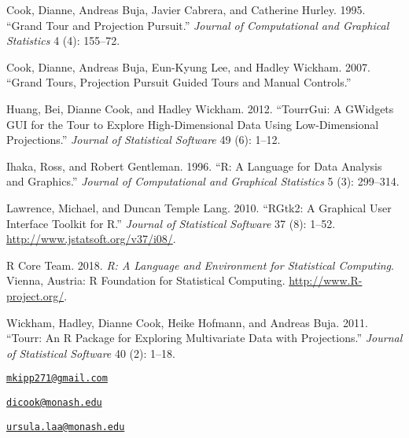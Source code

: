 Cook, Dianne, Andreas Buja, Javier Cabrera, and Catherine Hurley. 1995.
``Grand Tour and Projection Pursuit.'' \emph{Journal of Computational
and Graphical Statistics} 4 (4): 155--72.

Cook, Dianne, Andreas Buja, Eun-Kyung Lee, and Hadley Wickham. 2007.
``Grand Tours, Projection Pursuit Guided Tours and Manual Controls.''

Huang, Bei, Dianne Cook, and Hadley Wickham. 2012. ``TourrGui: A
GWidgets GUI for the Tour to Explore High-Dimensional Data Using
Low-Dimensional Projections.'' \emph{Journal of Statistical Software} 49
(6): 1--12.

Ihaka, Ross, and Robert Gentleman. 1996. ``R: A Language for Data
Analysis and Graphics.'' \emph{Journal of Computational and Graphical
Statistics} 5 (3): 299--314.

Lawrence, Michael, and Duncan {Temple Lang}. 2010. ``RGtk2: A Graphical
User Interface Toolkit for R.'' \emph{Journal of Statistical Software}
37 (8): 1--52. \url{http://www.jstatsoft.org/v37/i08/}.

R Core Team. 2018. \emph{R: A Language and Environment for Statistical
Computing}. Vienna, Austria: R Foundation for Statistical Computing.
\url{http://www.R-project.org/}.

Wickham, Hadley, Dianne Cook, Heike Hofmann, and Andreas Buja. 2011.
``Tourr: An R Package for Exploring Multivariate Data with
Projections.'' \emph{Journal of Statistical Software} 40 (2): 1--18.

\address{%
Michael Kipp\\
Monash University\\
Department of Econometrics and Business Statistics\\
}
\href{mailto:mkipp271@gmail.com}{\nolinkurl{mkipp271@gmail.com}}

\address{%
Dianne Cook\\
Monash University\\
Department of Econometrics and Business Statistics\\
}
\href{mailto:dicook@monash.edu}{\nolinkurl{dicook@monash.edu}}

\address{%
Ursula Laa\\
Monash University\\
School of Physics and Astronomy\\
}
\href{mailto:ursula.laa@monash.edu}{\nolinkurl{ursula.laa@monash.edu}}

